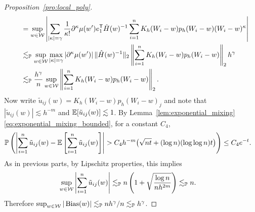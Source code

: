 \begin{proof}[Proposition~\ref{pro:local_poly}]
\begin{align*}
    &\quad=
    \sup_{w\in\mathcal{W}}
    \left|
    \sum_{|\kappa|=\gamma}
    \frac{1}{\kappa!}
    \partial^{\kappa} \mu(w')
    e_1^{\mathsf{T}} \hat H(w)^{-1}
    \sum_{i=1}^n K_h(W_i-w) p_h(W_i-w)
    (W_i-w)^\kappa
    \right| \\
    &\quad\lesssim_{\mathbb{P}}
    \sup_{w\in\mathcal{W}}
    \max_{|\kappa| = \gamma}
    \left|
    \partial^{\kappa} \mu(w')
    \right|
    \|\hat H(w)^{-1}\|_2
    \left\|
    \sum_{i=1}^n K_h(W_i-w) p_h(W_i-w)
    \right\|_2
    h^\gamma \\
    &\quad\lesssim_{\mathbb{P}}
    \frac{h^\gamma}{n}
    \sup_{w\in\mathcal{W}}
    \left\|
    \sum_{i=1}^n K_h(W_i-w) p_h(W_i-w)
    \right\|_2.
  \end{align*}
  Now write
  $\tilde u_{i j}(w) = K_h(W_i-w)p_h(W_i-w)_j$
  and note that
  $|\tilde u_{i j}(w)| \lesssim h^{-m}$
  and
  $\mathbb{E}[\tilde u_{i j}(w)] \lesssim 1$.
  By Lemma~\ref{lem:exponential_mixing}%
  \ref{eq:exponential_mixing_bounded},
  for a constant $C_4$,
  \begin{align*}
    \mathbb{P}\left(
      \left|
      \sum_{i=1}^n \tilde u_{i j}(w)
      - \mathbb{E}\left[
        \sum_{i=1}^n \tilde u_{i j}(w)
      \right]
      \right|
      > C_4 h^{-m} \big( \sqrt{n t}
      + (\log n)(\log \log n) t \big)
    \right)
    &\leq
    C_4 e^{-t}.
  \end{align*}
  As in previous parts, by Lipschitz properties,
  this implies
  \begin{align*}
    \sup_{w \in \mathcal{W}}
    \left|
    \sum_{i=1}^n \tilde u_{i j}(w)
    \right|
    &\lesssim_{\mathbb{P}}
    n
    \left(
      1 + \sqrt{\frac{\log n}{n h^{2m}}}
    \right)
    \lesssim_{\mathbb{P}}
    n.
  \end{align*}
  Therefore
  $\sup_{w\in\mathcal{W}} |\operatorname{Bias}(w)|
  \lesssim_{\mathbb{P}} n h^\gamma / n
  \lesssim_{\mathbb{P}} h^\gamma$.



\end{proof}
